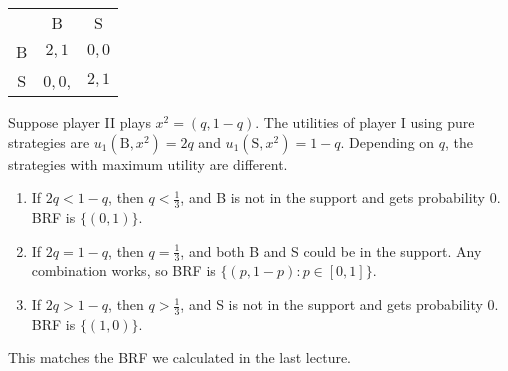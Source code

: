 \documentclass[12pt,letterpaper]{report}
\begin{document}
\begin{ex}
  \begin{center}
    \renewcommand{\arraystretch}{1.25}
    \begin{tabular}{c |c|c|}
      \multicolumn{1}{c}{} & \multicolumn{1}{c}{B} & \multicolumn{1}{c}{S} \\
      \cline{2-3}
      B & $2, 1$ & $0, 0$ \\
      \cline{2-3}
      S & $0, 0$, & $2, 1$ \\
      \cline{2-3}
    \end{tabular}
  \end{center}

  Suppose player II plays $x^2 = (q, 1 - q)$.
  The utilities of player I using pure strategies are $u_1(\text{B}, x^2) = 2q$ and
  $u_1(\text{S}, x^2) = 1 - q$.
  Depending on $q$, the strategies with maximum utility are different.
  \begin{enumerate}
    \item
    If $2q < 1 - q$, then $q < \frac{1}{3}$, and B is not in the support and gets probability 0.
    BRF is $\{(0, 1)\}$.
    \item
    If $2q = 1 - q$, then $q = \frac{1}{3}$, and both B and S could be in the support.
    Any combination works, so BRF is $\{(p, 1 - p) : p \in [0, 1]\}$.
    \item
    If $2q > 1 - q$, then $q > \frac{1}{3}$, and S is not in the support and gets probability 0.
    BRF is $\{(1, 0)\}$.
  \end{enumerate}
  This matches the BRF we calculated in the last lecture.
\end{ex}
\end{document}
